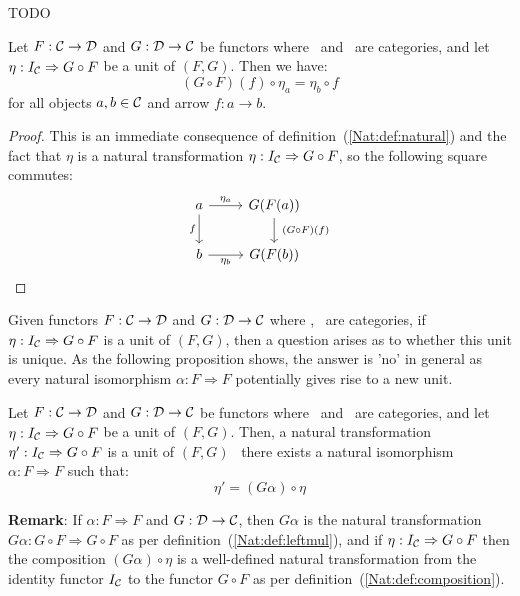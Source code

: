 TODO
\begin{prop}\label{Adj:prop:counit:natural}
    Let $F:\mbox{$\cal C$}\to\mbox{$\cal D$}$ and $G:\mbox{$\cal D$}\to\mbox{$\cal C$}$ be functors where \Cat\ and \Dat\ 
    are categories, and let $\eta:I_{\cal C}\Rightarrow G\circ F$ be a unit 
    of $(F,G)$. Then we have:
        \[
            (G\circ F)(f)\circ\eta_{a}=\eta_{b}\circ f
        \]
    for all objects $a,b\in\mbox{$\cal C$}$ and arrow $f:a\to b$.
\end{prop}
\begin{proof}
    This is an immediate consequence of definition~(\ref{Nat:def:natural}) 
    and the fact that $\eta$ is a natural transformation 
    $\eta:I_{\cal C}\Rightarrow G\circ F$, so the following square commutes:
    \[
        \begin{tikzcd}
            a\arrow[r, "\eta_{a}"]\arrow[d, swap,"f"]
            &G(F(a))\arrow[d, "\ (G\circ F)(f)"]
            \\
            b\arrow[r, swap, "\eta_{b}"]
            &G(F(b))
        \end{tikzcd}
    \]
\end{proof}

Given functors $F:\mbox{$\cal C$}\to\mbox{$\cal D$}$ and $G:\mbox{$\cal D$}\to\mbox{$\cal C$}$ where \Cat, \Dat\ are 
categories, if $\eta:I_{\cal C}\Rightarrow G\circ F$ is a unit of $(F,G)$,
then a question arises as to whether this unit is unique. As the following
proposition shows, the answer is 'no' in general as every natural 
isomorphism $\alpha : F\Rightarrow F$ potentially gives rise to a 
new unit.

\begin{prop}\label{Adj:prop:counit:not:unique}
    Let $F:\mbox{$\cal C$}\to\mbox{$\cal D$}$ and $G:\mbox{$\cal D$}\to\mbox{$\cal C$}$ be functors where \Cat\ and \Dat\ 
    are categories, and let $\eta:I_{\cal C}\Rightarrow G\circ F$ be a unit
    of $(F,G)$. Then, a natural transformation $\eta':I_{\cal C}\Rightarrow 
    G\circ F$ is a unit of $(F,G)$ \ifand\ there exists a natural isomorphism 
    $\alpha:F\Rightarrow F$ such that:
        \[
            \eta'=(G\alpha)\circ\eta
        \]
\end{prop}

\noindent
{\bf Remark}: If $\alpha: F\Rightarrow F$ and $G:\mbox{$\cal D$}\to\mbox{$\cal C$}$, then $G\alpha$
is the natural transformation $G\alpha:G\circ F\Rightarrow G\circ F$ as per
definition~(\ref{Nat:def:leftmul}), and if $\eta:I_{\cal C}\Rightarrow G\circ F$
then the composition $(G\alpha)\circ\eta$ is a well-defined natural 
transformation from the identity functor $I_{\cal C}$ to the functor $G\circ F$ 
as per definition~(\ref{Nat:def:composition}).

